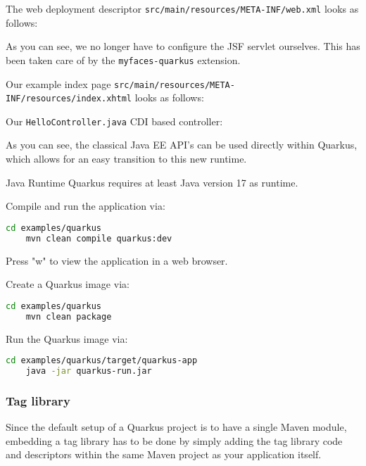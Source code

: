 The web deployment descriptor \texttt{src/main/resources/META-INF/web.xml} looks as follows:

As you can see, we no longer have to configure the JSF servlet ourselves.
This has been taken care of by the \texttt{myfaces-quarkus} extension.

Our example index page \texttt{src/main/resources/META-INF/resources/index.xhtml} looks as follows:


Our \texttt{HelloController.java} CDI based controller:

As you can see, the classical Java EE API's can be used directly within Quarkus, which allows for an easy transition to this new runtime.

\begin{TIP}{Java Runtime}
	Quarkus requires at least Java version 17 as runtime.
\end{TIP}

Compile and run the application via:
\begin{lstlisting}[language=bash]
	cd examples/quarkus
	mvn clean compile quarkus:dev
\end{lstlisting}
Press "w" to view the application in a web browser.

Create a Quarkus image via:
\begin{lstlisting}[language=bash]
	cd examples/quarkus
	mvn clean package
\end{lstlisting}
Run the Quarkus image via:
\begin{lstlisting}[language=bash]
	cd examples/quarkus/target/quarkus-app
	java -jar quarkus-run.jar
\end{lstlisting}


\subsubsection{Tag library}
Since the default setup of a Quarkus project is to have a single Maven module,
embedding a tag library has to be done by simply adding the tag library code and descriptors within the same Maven project as your application itself.


